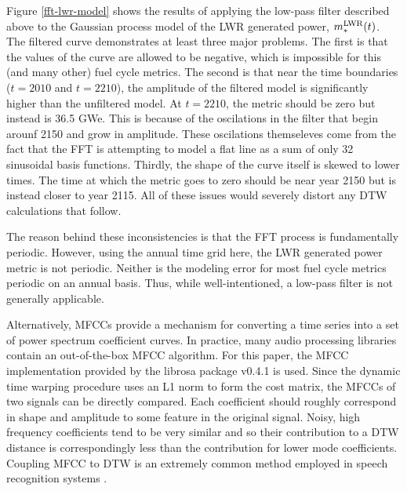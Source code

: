 Figure \ref{fft-lwr-model} shows the results of applying the low-pass filter 
described above to the Gaussian process model of the LWR generated power, 
$m_*^{\mathrm{LWR}}(t)$.  The filtered curve demonstrates at least three major problems.  The
first is that the values of the curve are allowed to be negative, which is 
impossible for this (and many other) fuel cycle metrics.  The second is that 
near the time boundaries ($t=2010$ and $t=2210$), the amplitude of the filtered model
is significantly higher than the unfiltered model. At $t=2210$, the metric 
should be zero but
instead is 36.5 GWe. This is because of the oscilations in the filter that 
begin arounf 2150 and grow in amplitude. These oscilations themseleves 
come from the fact that the FFT is attempting to model a flat line as a sum
of only 32 sinusoidal basis functions. 
Thirdly, the shape of the curve itself is skewed to lower 
times. The time at which the metric goes to zero should be near year 2150 but is 
instead closer to year 2115.  All of these issues would severely distort any 
DTW calculations that follow.

The reason behind these inconsistencies is that the FFT process is fundamentally 
periodic.  However, using the annual time grid here, the LWR generated power metric
is not periodic. Neither is the modeling error for most fuel cycle metrics periodic
on an annual basis. 
Thus, while well-intentioned, a low-pass filter is not generally applicable.

Alternatively, MFCCs provide a mechanism for converting a time series into a 
set of power spectrum coefficient curves. In practice, many audio processing
libraries contain an out-of-the-box MFCC algorithm. For this paper, 
the MFCC implementation provided by the librosa package v0.4.1
\cite{mcfee2015librosa} is used.
Since the dynamic time warping procedure
uses an L1 norm to form the cost matrix, the MFCCs of two signals can be directly 
compared. Each coefficient should roughly correspond in shape and amplitude to some
feature in the original signal.  Noisy, high frequency coefficients tend to be 
very similar and so their contribution to a DTW distance is correspondingly less 
than the contribution for lower mode coefficients. Coupling MFCC to DTW is an 
extremely common method employed in speech recognition systems 
\cite{muda2010voice,milner2002speech,sato2007emotion}.  

